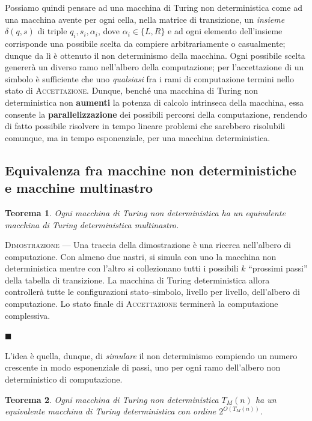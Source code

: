 \documentclass[10pt]{\classname}
\newtheorem{thm}{Teorema}
\theoremstyle{definition}
\theoremstyle{definition}
\begin{document}
Possiamo quindi pensare ad una macchina di Turing non deterministica
come ad una macchina avente per ogni cella, nella matrice di transizione, un
\emph{insieme} $\delta(q,s)$ di triple $q_i, s_i, \alpha_i$, dove $\alpha_i \in
\{L,R\}$ e ad ogni elemento dell'insieme corrisponde una possibile scelta da
compiere arbitrariamente o casualmente; dunque da lì è ottenuto il non
determinismo della macchina. Ogni possibile scelta genererà un diverso ramo
nell'albero della computazione; per l'accettazione di un simbolo è
sufficiente che uno \emph{qualsiasi} fra i rami di computazione termini nello
stato di \textsc{Accettazione}. Dunque, benché una macchina di Turing non
deterministica non \textbf{aumenti} la potenza di calcolo intrinseca della
macchina, essa consente la \textbf{parallelizzazione} dei possibili percorsi
della computazione, rendendo di fatto possibile risolvere in tempo lineare
problemi che sarebbero risolubili comunque, ma in tempo esponenziale, per una
macchina deterministica.

\subsection{Equivalenza fra macchine non deterministiche e macchine multinastro}

\begin{thm}
    Ogni macchina di Turing non deterministica ha un equivalente macchina di
    Turing deterministica multinastro.
\end{thm}

\textsc{Dimostrazione} --- Una traccia della dimostrazione è una ricerca
nell'albero di computazione. Con almeno due nastri, si simula con uno la
macchina non deterministica mentre con l'altro si collezionano tutti i
possibili $k$ ``prossimi passi'' della tabella di transizione. La macchina di
Turing deterministica allora controllerà tutte le configurazioni
stato--simbolo, livello per livello, dell'albero di computazione. Lo stato
finale di \textsc{Accettazione } terminerà la computazione complessiva.

\begin{flushright}
$\blacksquare$
\end{flushright}

L'idea è quella, dunque, di \emph{simulare} il non determinismo compiendo un
numero crescente in modo esponenziale di passi, uno per ogni ramo dell'albero
non deterministico di computazione.

\begin{thm}
    Ogni macchina di Turing non deterministica $T_M(n)$ ha un equivalente
    macchina di Turing deterministica con ordine $2^{O(T_M(n))}$.
\end{thm}
\end{document}
